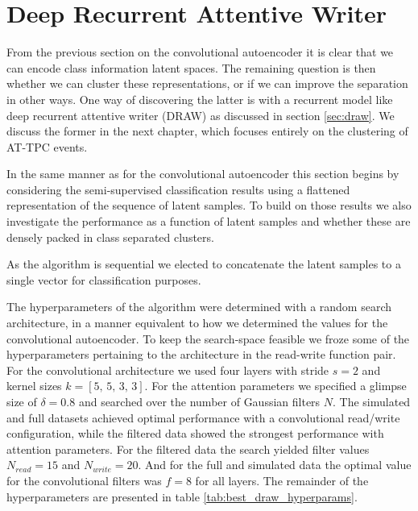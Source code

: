 \section{Deep Recurrent Attentive Writer }

From the previous section on the convolutional autoencoder it is clear that we can encode class information latent spaces. The remaining question is then whether we can cluster these representations, or if we can improve the separation in other ways. One way of discovering the latter is with a recurrent model like deep recurrent attentive writer (DRAW) as discussed in section \ref{sec:draw}. We discuss the former in the next chapter, which focuses entirely on the clustering of AT-TPC events.

In the same manner as for the convolutional autoencoder this section begins by considering the semi-supervised classification results using a flattened representation of the sequence of latent samples. To build on those results we also investigate the performance as a function of latent samples and whether these are densely packed in class separated clusters.

As the algorithm is sequential we elected to concatenate the latent samples to a single vector for classification purposes.

The hyperparameters of the algorithm were determined with a random search architecture, in a manner equivalent to how we determined the values for the convolutional autoencoder. To keep the search-space feasible we froze some of the hyperparameters pertaining to the architecture in the read-write function pair. For the convolutional architecture we used four layers with stride $s=2$ and kernel sizes $k= [5,\, 5,\, 3,\, 3]$. For the attention parameters we specified a glimpse size of $\delta=0.8$ and searched over the number of Gaussian filters $N$. The simulated and full datasets achieved optimal performance with a convolutional read/write configuration, while the filtered data showed the strongest performance with attention parameters. For the filtered data the search yielded filter values $N_{read} = 15$ and $N_{write}=20$. And for the full and simulated data the optimal value for the convolutional filters was $f=8$ for all layers. The remainder of the hyperparameters are presented in table \ref{tab:best_draw_hyperparams}.


